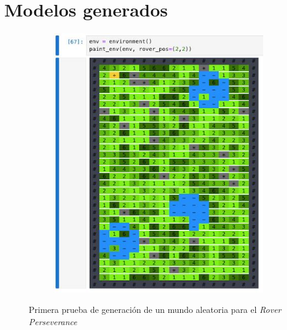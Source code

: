 \documentclass[12pt, letterpaper]{article}
\begin{document}
\section{Modelos generados}

    \begin{figure}[h!]
        \centering
        \begin{subfigure}[!ht]{0.45\textwidth}
            \centering
            \includegraphics[scale=0.25,angle=0]{env.jpeg}
        \end{subfigure}
        \hfill
        \centering
        \caption{Primera prueba de generación de un mundo aleatoria para el \textit{Rover Perseverance}}\label{env}
    \end{figure}
\end{document}

